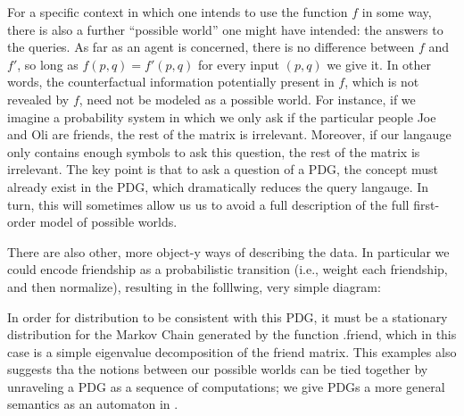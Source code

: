 \documentclass{article}
\theoremstyle{definition}
\theoremstyle{remark}
\newcommand{\var}[1]{\mathsf{#1}}
\begin{document}
\begin{example}
    For a specific context in which one intends to use the function $f$ in some way, there is also a further ``possible world'' one might have intended: the answers to the queries. As far as an agent is concerned, there is no difference between $f$ and $f'$, so long as $f(p,q) = f'(p,q)$ for every input $(p,q)$ we give it. In other words, the counterfactual information potentially present in $f$, which is not revealed by $f$, need not be modeled as a possible world. For instance, if we imagine a probability system in which we only ask if the particular people Joe and Oli are friends, the rest of the matrix is irrelevant.     
    Moreover, if our langauge only contains enough symbols to ask this question, the rest of the matrix is irrelevant. 
    The key point is that to ask a question of a PDG, the concept must already exist in the PDG, which dramatically reduces the query langauge. In turn, this will sometimes allow us us to avoid a full description of the full first-order model of possible worlds. 

    There are also other, more object-y ways of describing the data. In particular we could encode friendship as a probabilistic transition (i.e., weight each friendship, and then normalize), resulting in the folllwing, very simple diagram:
    \begin{center}
        \hspace{1cm}
    \end{center}
    In order for distribution to be consistent with this PDG, it must be a stationary distribution for the Markov Chain generated by the function .friend, which in this case is a simple eigenvalue decomposition of the friend matrix. This examples also suggests tha the notions between our possible worlds can be tied together by unraveling a PDG as a sequence of computations; we give PDGs a more general semantics as an automaton in .
\end{example}
\end{document}
